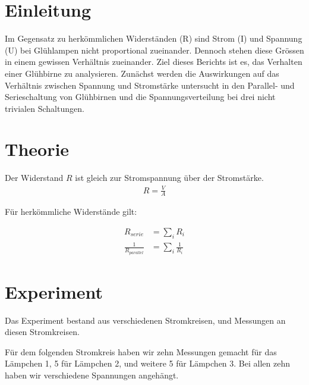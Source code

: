 \documentclass[12pt, a4paper, twoside]{article}
\begin{document}
\maketitlepage

\section{Einleitung}
Im Gegensatz zu herkömmlichen Widerständen (R) sind Strom (I) und Spannung (U) bei Glühlampen nicht proportional zueinander. Dennoch stehen diese Grössen in einem gewissen Verhältnis zueinander. Ziel dieses Berichts ist es, das Verhalten einer Glühbirne zu analysieren. Zunächst werden die Auswirkungen auf das Verhältnis zwischen Spannung und Stromstärke untersucht in den Parallel- und Serieschaltung von Glühbirnen und die Spannungsverteilung bei drei nicht trivialen Schaltungen.


\section{Theorie}
Der Widerstand $R$ ist gleich zur Stromspannung über der Stromstärke.
\begin{align*}
  R = \frac{V}{A}
\end{align*}

Für herkömmliche Widerstände gilt:

\begin{align*}
  R_{serie} &= \sum_{i}R_i\\
  \frac{1}{R_{parallel}} &= \sum_{i} \frac{1}{R_i}
\end{align*}
\cite{FoTa, S.176}

\section{Experiment}
Das Experiment bestand aus verschiedenen Stromkreisen, und Messungen an diesen Stromkreisen.
\par
Für dem folgenden Stromkreis haben wir zehn Messungen gemacht für das Lämpchen 1, 5 für Lämpchen 2, und weitere 5 für Lämpchen 3.
Bei allen zehn haben wir verschiedene Spannungen angehängt.\\


\end{document}
